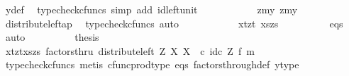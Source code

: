 \begin{isabellebody}
\ y{\isacharprime}{\kern0pt}{\isacharunderscore}{\kern0pt}def\ \isamarkupfalse%
\ {\isacharparenleft}{\kern0pt}typecheck{\isacharunderscore}{\kern0pt}cfuncs{\isacharcomma}{\kern0pt}\ simp\ add{\isacharcolon}{\kern0pt}\ id{\isacharunderscore}{\kern0pt}left{\isacharunderscore}{\kern0pt}unit{}{\isacharparenright}{\kern0pt}\isanewline
\ \ \ \ \ \ \isamarkupfalse%
\ \isamarkupfalse%
\ {\isachardoublequoteopen}{\isachardot}{\kern0pt}{\isachardot}{\kern0pt}{\isachardot}{\kern0pt}\ {\isacharequal}{\kern0pt}\ {\isasymlangle}{\isasymlangle}z{\isacharcomma}{\kern0pt}my{}{\isasymrangle}{\isacharcomma}{\kern0pt}\ {\isasymlangle}z{\isacharcomma}{\kern0pt}my{}{\isasymrangle}{\isasymrangle}{\isachardoublequoteclose}\isanewline
\ \ \ \ \ \ \ \ \isamarkupfalse%
\ distribute{\isacharunderscore}{\kern0pt}left{\isacharunderscore}{\kern0pt}ap\ \isamarkupfalse%
\ {\isacharparenleft}{\kern0pt}typecheck{\isacharunderscore}{\kern0pt}cfuncs{\isacharcomma}{\kern0pt}\ auto{\isacharparenright}{\kern0pt}\isanewline
\ \ \ \ \ \ \isamarkupfalse%
\ \isamarkupfalse%
\ {\isachardoublequoteopen}{\isachardot}{\kern0pt}{\isachardot}{\kern0pt}{\isachardot}{\kern0pt}\ {\isacharequal}{\kern0pt}\ {\isasymlangle}{\isasymlangle}xt{\isacharcomma}{\kern0pt}zt{\isasymrangle}{\isacharcomma}{\kern0pt}\ {\isasymlangle}xs{\isacharcomma}{\kern0pt}zs{\isasymrangle}{\isasymrangle}{\isachardoublequoteclose}\isanewline
\ \ \ \ \ \ \ \ \isamarkupfalse%
\ eqs\ \isamarkupfalse%
\ auto\isanewline
\ \ \ \ \ \ \isamarkupfalse%
\ \isamarkupfalse%
\ {\isacharquery}{\kern0pt}thesis\isacommand{{\isachardot}{\kern0pt}}\isamarkupfalse%
\isanewline
\ \ \ \ \isamarkupfalse%
\isanewline
\ \ \ \ \isamarkupfalse%
\ \isamarkupfalse%
\ {\isachardoublequoteopen}{\isasymlangle}{\isasymlangle}xt{\isacharcomma}{\kern0pt}zt{\isasymrangle}{\isacharcomma}{\kern0pt}{\isasymlangle}xs{\isacharcomma}{\kern0pt}zs{\isasymrangle}{\isasymrangle}\ factorsthru\ {\isacharparenleft}{\kern0pt}distribute{\isacharunderscore}{\kern0pt}left\ Z\ X\ X\ \ {\isasymcirc}\isactrlsub c\ {\isacharparenleft}{\kern0pt}id\isactrlsub c\ Z\ {\isasymtimes}\isactrlsub f\ m{\isacharparenright}{\kern0pt}{\isacharparenright}{\kern0pt}{\isachardoublequoteclose}\isanewline
\ \ \ \ \ \ \isamarkupfalse%
\ {\isacharparenleft}{\kern0pt}typecheck{\isacharunderscore}{\kern0pt}cfuncs{\isacharcomma}{\kern0pt}\ metis\ cfunc{\isacharunderscore}{\kern0pt}prod{\isacharunderscore}{\kern0pt}type\ eqs\ factors{\isacharunderscore}{\kern0pt}through{\isacharunderscore}{\kern0pt}def{}\ y{\isacharprime}{\kern0pt}{\isacharunderscore}{\kern0pt}type{\isacharparenright}{\kern0pt}\isanewline

\end{isabellebody}
